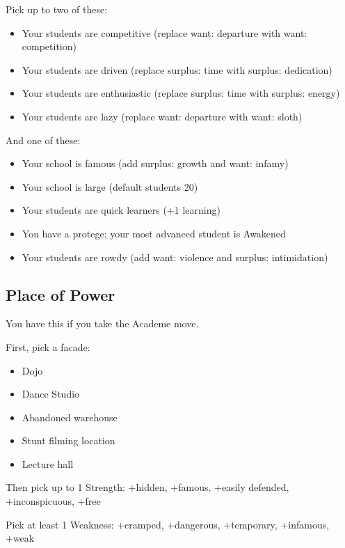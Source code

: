 \documentclass[
  oneside,
  statementpaper,
  9pt]{memoir}
\begin{document}
Pick up to two of these:

\begin{itemize}
\tightlist
\item
  Your students are competitive (replace want: departure with want:
  competition)
\item
  Your students are driven (replace surplus: time with surplus:
  dedication)
\item
  Your students are enthusiastic (replace surplus: time with surplus:
  energy)
\item
  Your students are lazy (replace want: departure with want: sloth)
\end{itemize}

And one of these:

\begin{itemize}
\tightlist
\item
  Your school is famous (add surplus: growth and want: infamy)
\item
  Your school is large (default students 20)
\item
  Your students are quick learners (+1 learning)
\item
  You have a protege; your most advanced student is Awakened
\item
  Your students are rowdy (add want: violence and surplus: intimidation)
\end{itemize}

\hypertarget{place-of-power-1}{%
\subsection{Place of Power}\label{place-of-power-1}}

You have this if you take the Academe move.

First, pick a facade:

\begin{itemize}
\tightlist
\item
  Dojo
\item
  Dance Studio
\item
  Abandoned warehouse
\item
  Stunt filming location
\item
  Lecture hall
\end{itemize}

Then pick up to 1 Strength: +hidden, +famous, +easily defended,
+inconspicuous, +free

Pick at least 1 Weakness: +cramped, +dangerous, +temporary, +infamous,
+weak
\end{document}
